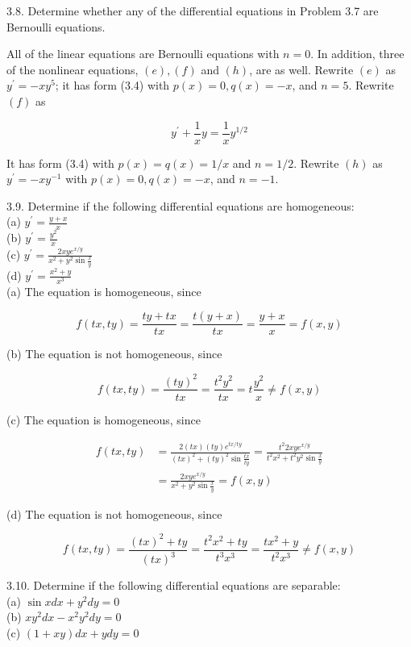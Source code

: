\documentclass[10pt]{article}
\begin{document}
3.8. Determine whether any of the differential equations in Problem 3.7 are Bernoulli equations.

All of the linear equations are Bernoulli equations with $n=0$. In addition, three of the nonlinear equations, $(e),(f)$ and $(h)$, are as well. Rewrite $(e)$ as $y^{\prime}=-x y^{5}$; it has form (3.4) with $p(x)=0, q(x)=-x$, and $n=5$. Rewrite $(f)$ as

$$
y^{\prime}+\frac{1}{x} y=\frac{1}{x} y^{1 / 2}
$$

It has form (3.4) with $p(x)=q(x)=1 / x$ and $n=1 / 2$. Rewrite $(h)$ as $y^{\prime}=-x y^{-1}$ with $p(x)=0, q(x)=-x$, and $n=-1$.

3.9. Determine if the following differential equations are homogeneous:\\
(a) $y^{\prime}=\frac{y+x}{x}$\\
(b) $y^{\prime}=\frac{y^{2}}{x}$\\
(c) $y^{\prime}=\frac{2 x y e^{x / y}}{x^{2}+y^{2} \sin \frac{x}{y}}$\\
(d) $y^{\prime}=\frac{x^{2}+y}{x^{3}}$\\
(a) The equation is homogeneous, since

$$
f(t x, t y)=\frac{t y+t x}{t x}=\frac{t(y+x)}{t x}=\frac{y+x}{x}=f(x, y)
$$

(b) The equation is not homogeneous, since

$$
f(t x, t y)=\frac{(t y)^{2}}{t x}=\frac{t^{2} y^{2}}{t x}=t \frac{y^{2}}{x} \neq f(x, y)
$$

(c) The equation is homogeneous, since

$$
\begin{aligned}
f(t x, t y) & =\frac{2(t x)(t y) e^{t x / t y}}{(t x)^{2}+(t y)^{2} \sin \frac{t x}{t y}}=\frac{t^{2} 2 x y e^{x / y}}{t^{2} x^{2}+t^{2} y^{2} \sin \frac{x}{y}} \\
& =\frac{2 x y e^{x / y}}{x^{2}+y^{2} \sin \frac{x}{y}}=f(x, y)
\end{aligned}
$$

(d) The equation is not homogeneous, since

$$
f(t x, t y)=\frac{(t x)^{2}+t y}{(t x)^{3}}=\frac{t^{2} x^{2}+t y}{t^{3} x^{3}}=\frac{t x^{2}+y}{t^{2} x^{3}} \neq f(x, y)
$$

3.10. Determine if the following differential equations are separable:\\
(a) $\sin x d x+y^{2} d y=0$\\
(b) $x y^{2} d x-x^{2} y^{2} d y=0$\\
(c) $(1+x y) d x+y d y=0$
\end{document}
